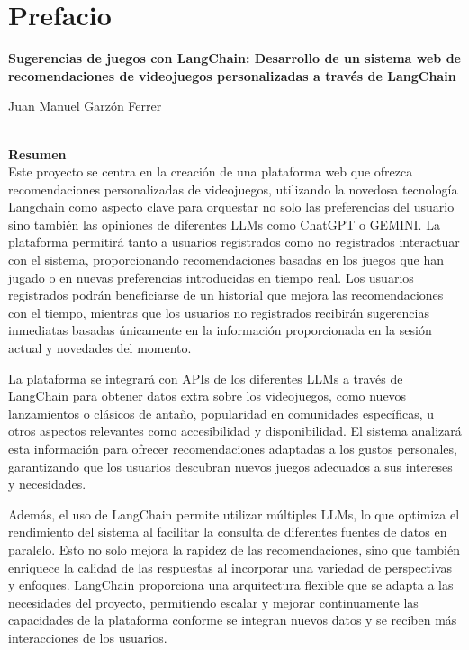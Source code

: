 
\chapter*{Prefacio}

\begin{center}
{\large\bfseries Sugerencias de juegos con
LangChain: Desarrollo de un sistema web de recomendaciones de
videojuegos personalizadas a través de LangChain}\\
\end{center}
\begin{center}
Juan Manuel Garzón Ferrer\\
\end{center}

\\

{\textbf{Resumen}}\\

Este proyecto se centra en la creación de una plataforma web que ofrezca recomendaciones personalizadas de videojuegos, utilizando la novedosa tecnología Langchain como aspecto clave para orquestar no solo las preferencias del usuario sino también las opiniones de diferentes LLMs como ChatGPT o GEMINI. La plataforma permitirá tanto a usuarios registrados como no registrados interactuar con el sistema, proporcionando recomendaciones basadas en los juegos que han jugado o en nuevas preferencias introducidas en tiempo real. Los usuarios registrados podrán beneficiarse de un historial que mejora las recomendaciones con el tiempo, mientras que los usuarios no registrados recibirán sugerencias inmediatas basadas únicamente en la información proporcionada en la sesión actual y novedades del momento.

La plataforma se integrará con APIs de los diferentes LLMs a través de LangChain para obtener datos extra sobre los videojuegos, como nuevos lanzamientos o clásicos de antaño, popularidad en comunidades específicas, u otros aspectos relevantes como accesibilidad y disponibilidad. El sistema analizará esta información para ofrecer recomendaciones adaptadas a los gustos personales, garantizando que los usuarios descubran nuevos juegos adecuados a sus intereses y necesidades.

Además, el uso de LangChain permite utilizar múltiples LLMs, lo que optimiza el rendimiento del sistema al facilitar la consulta de diferentes fuentes de datos en paralelo. Esto no solo mejora la rapidez de las recomendaciones, sino que también enriquece la calidad de las respuestas al incorporar una variedad de perspectivas y enfoques. LangChain proporciona una arquitectura flexible que se adapta a las necesidades del proyecto, permitiendo escalar y mejorar continuamente las capacidades de la plataforma conforme se integran nuevos datos y se reciben más interacciones de los usuarios.


